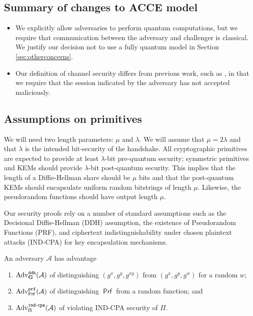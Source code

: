 \documentclass[USenglish,oneside,twocolumn]{article}
\theoremstyle{dgthm}
\theoremstyle{dgdef}
\newcommand{\Protocol}[1]{\operatorname{\mathsf{#1}}}
\newcommand{\AlgorithmName}[1]{\operatorname{\mathsf{#1}}}
\newcommand{\PRF}{\AlgorithmName{Prf}}
\newcommand{\Oracle}[1]{\mathcal #1}
\newcommand{\Experiment}[1]{\operatorname{\tt{#1}}}
\newcommand{\Algorithm}[1]{\mathcal #1}
\newcommand{\AdvName}[2]{\operatorname{\mathrm{Adv}_{\Protocol{#1}}^{\Experiment{#2}}}}
\newcommand{\Adv}[3]{\AdvName{#1}{#2}(\Algorithm{#3})}
\newcommand{\IndCpa}[2]{\Adv{#1}{ind-cpa}{#2}}
\newcommand{\AdvPrf}[2]{\Adv{#1}{prf}{#2}}
\newcommand{\AdvDdh}[1]{\Adv{\mathbf{G}}{ddh}{#1}}
\begin{document}
  \subsection{Summary of changes to ACCE model}
    \begin{itemize}
      \item We explicitly allow adversaries to perform quantum computations,
        but we require that communication between the adversary and challenger
        is classical.  We justify our decision not to use a fully quantum model
        in Section \ref{sec:otherconcerns}.

      \item Our definition of channel security differs from previous work,
        such as \cite{Jager2012, Krawczyk2013}, in that we require that the session
        indicated by the adversary has not accepted maliciously.
    \end{itemize}

  \subsection{Assumptions on primitives}
  We will need two length parameters: $\mu$ and $\lambda$. We will assume that
  $\mu = 2\lambda$ and that $\lambda$ is the intended bit-security of the
  handshake. All cryptographic primitives are expected to provide at least
  $\lambda$-bit pre-quantum security; symmetric primitives and KEMs should
  provide $\lambda$-bit post-quantum security. This implies that the length of a
  Diffie-Hellman share should be $\mu$ bits and that the post-quantum
  KEMs should encapsulate uniform random bitstrings of length $\mu$. Likewise,
  the pseudorandom functions should have output length $\mu$.

  Our security proofs rely on a number of standard assumptions such as the
  Decisional Diffie-Hellman (DDH) assumption, the existence of Pseudorandom
  Functions (PRF), and ciphertext indistinguishability under chosen plaintext
  attacks (IND-CPA) for key encapsulation mechanisms.

  An adversary $\Oracle{A}$ has advantage
  \begin{enumerate}
    \item $\AdvDdh{A}$ of distinguishing $(g^x, g^y, g^{xy})$ from $(g^x, g^y, g^w)$ for
      a random $w$;
    \item $\AdvPrf{\PRF}{A}$ of distinguishing $\PRF$ from a random function; and
    \item $\IndCpa{\Pi}{A}$ of violating IND-CPA security of $\Pi$.
  \end{enumerate}
\end{document}
